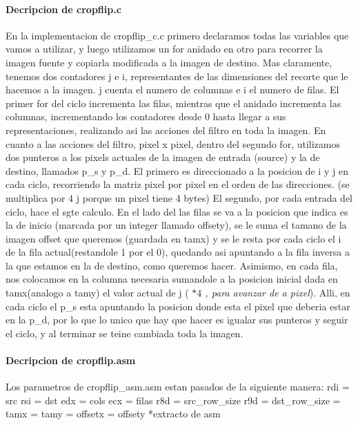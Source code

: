 \documentclass[a4paper]{article}
\begin{document}
\paragraph{\textbf{Decripcion de cropflip.c}}
\hfill \break
	En la implementacion de cropflip_c.c primero declaramos todas las variables que vamos a utilizar, y luego  utilizamos un for anidado en otro para recorrer la imagen fuente y copiarla modificada a la imagen de destino.
\hfill \break
	Mas claramente, tenemos dos contadores j e i, representantes de las dimensiones del recorte que le hacemos a la imagen. j cuenta el numero de columnas e i el numero de filas. El primer for del ciclo incrementa las filas, mientras que el anidado incrementa las columnas, incrementando los contadores desde 0 hasta llegar a sus representaciones, realizando asi las acciones del filtro en toda la imagen.
\hfill \break	
	 En cuanto a las acciones del filtro, pixel x pixel, dentro del segundo for, utilizamos dos punteros a los pixels actuales de la imagen de entrada (source) y la  de destino, llamados p_s y p_d.
\hfill \break 
	 El primero es direccionado a la posicion de i y j en cada ciclo, recorriendo la matriz pixel por pixel en el orden de las direcciones. (se multiplica por 4 j porque un pixel tiene 4 bytes) El segundo, por cada entrada del ciclo, hace el sgte calculo. En el lado del las filas se va a la posicion que indica es la de inicio (marcada por un integer llamado offsety), se le suma el tamano de la imagen offset que queremos (guardada en tamx) y se le resta por cada ciclo el i de la fila actual(restandole 1 por el 0), quedando asi apuntando a la fila inversa a la que estamos en la de destino, como queremos hacer. Asimismo, en cada fila, nos colocamos en la columna necesaria sumandole a la posicion inicial dada en tamx(analogo a tamy) el valor actual de j (\textit{ $*4$ , para avanzar de a pixel}).
Alli, en cada ciclo el p_s esta apuntando la posicion donde esta el pixel que deberia estar en la p_d, por lo que lo unico que hay que hacer es igualar sus punteros y seguir el ciclo, y al terminar se teine cambiada toda la imagen.


\paragraph{\textbf{Decripcion de cropflip.asm}}
\hfill \break
	
 	Los parametros de cropflip_asm.asm estan pasados de la siguiente manera:
 	\hfill \break
 	 rdi = src
 	 \hfill \break
     rsi = dst
     \hfill \break 
     edx = cols
     \hfill \break
     ecx = filas
     \hfill \break
     r8d = src_row_size
     \hfill \break
     r9d = dst_row_size
     \hfill \break
     [rsp+8] = tamx
     \hfill \break
     [rsp+16] = tamy
     \hfill \break
     [rsp+24] = offsetx
     \hfill \break
     [rsp+32] = offsety
     \hfill \break
  *extracto de asm
     
\end{document}
